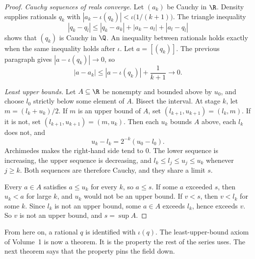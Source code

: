 \begin{proof}
\emph{Cauchy sequences of reals converge.} Let $(a_k)$ be Cauchy in $\R$. Density supplies rationals $q_k$ with $|a_k-\iota(q_k)|<\iota\bigl(1/(k+1)\bigr)$. The triangle inequality
\[
|q_k-q_l|\le|q_k-a_k|+|a_k-a_l|+|a_l-q_l|
\]
shows that $(q_k)$ is Cauchy in $\Q$. An inequality between rationals holds exactly when the same inequality holds after $\iota$. Let $a=[(q_k)]$. The previous paragraph gives $|a-\iota(q_k)|\to 0$, so
\[
|a-a_k|\le|a-\iota(q_k)|+\frac{1}{k+1}\to 0.
\]

\emph{Least upper bounds.} Let $A\subseteq\R$ be nonempty and bounded above by $u_0$, and choose $l_0$ strictly below some element of $A$. Bisect the interval. At stage $k$, let $m=(l_k+u_k)/2$. If $m$ is an upper bound of $A$, set $(l_{k+1},u_{k+1})=(l_k,m)$. If it is not, set $(l_{k+1},u_{k+1})=(m,u_k)$. Then each $u_k$ bounds $A$ above, each $l_k$ does not, and
\[
u_k-l_k=2^{-k}(u_0-l_0).
\]
Archimedes makes the right-hand side tend to $0$. The lower sequence is increasing, the upper sequence is decreasing, and $l_k\le l_j\le u_j\le u_k$ whenever $j\ge k$. Both sequences are therefore Cauchy, and they share a limit $s$.

Every $a\in A$ satisfies $a\le u_k$ for every $k$, so $a\le s$. If some $a$ exceeded $s$, then $u_k<a$ for large $k$, and $u_k$ would not be an upper bound. If $v<s$, then $v<l_k$ for some $k$. Since $l_k$ is not an upper bound, some $a\in A$ exceeds $l_k$, hence exceeds $v$. So $v$ is not an upper bound, and $s=\sup A$.
\end{proof}

From here on, a rational $q$ is identified with $\iota(q)$. The least-upper-bound axiom of Volume~1 is now a theorem. It is the property the rest of the series uses. The next theorem says that the property pins the field down.

